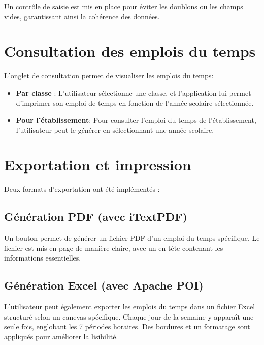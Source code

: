 \documentclass[english,12pt,a4paper]{report}
\begin{document}
Un contrôle de saisie est mis en place pour éviter les doublons ou les champs vides, garantissant ainsi la cohérence des données.

\section{Consultation des emplois du temps}
L’onglet de consultation permet de visualiser les emplois du temps:
\begin{itemize}
	\item \textbf{Par classe} : L'utilisateur sélectionne une classe, et l’application lui permet d'imprimer son emploi de temps en fonction de l'année scolaire sélectionnée.
	\item \textbf{Pour l'établissement}: Pour consulter l'emploi du temps de l'établissement, l'utilisateur peut le générer en sélectionnant une année scolaire.
\end{itemize}

\section{Exportation et impression}
Deux formats d’exportation ont été implémentés :
\subsection{Génération PDF (avec iTextPDF)}
Un bouton permet de générer un fichier PDF d’un emploi du temps spécifique. Le fichier est mis en page de manière claire, avec un en-tête contenant les informations essentielles.
\subsection{Génération Excel (avec Apache POI)}
L’utilisateur peut également exporter les emplois du temps dans un fichier Excel structuré selon un canevas spécifique. Chaque jour de la semaine y apparaît une seule fois, englobant les 7 périodes horaires. Des bordures et un formatage sont appliqués pour améliorer la lisibilité.
\end{document}
